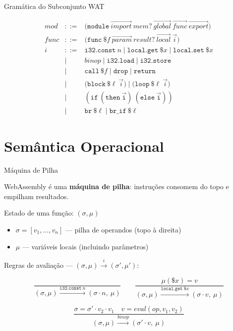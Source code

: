 \begin{frame}{Gramática do Subconjunto WAT}

    \[\begin{array}{lcl}
    \mathit{mod} & ::= & \mathtt{(module}\ \vec{\mathit{import}}\ \mathit{mem}?\ \vec{\mathit{global}}\ \vec{\mathit{func}}\ \vec{\mathit{export}}\mathtt{)} \\
    \mathit{func} & ::= & \mathtt{(func}\ \$f\ \vec{\mathit{param}}\ \mathit{result}?\ \vec{\mathit{local}}\ \vec{i}\mathtt{)} \\
    i & ::= & \mathtt{i32.const}\ n \mid \mathtt{local.get}\ \$x \mid \mathtt{local.set}\ \$x \\
    & \mid & \mathit{binop} \mid \mathtt{i32.load} \mid \mathtt{i32.store} \\
    & \mid & \mathtt{call}\ \$f \mid \mathtt{drop} \mid \mathtt{return} \\
    & \mid & \mathtt{(block}\ \$\ell\ \vec{i}\mathtt{)} \mid \mathtt{(loop}\ \$\ell\ \vec{i}\mathtt{)} \\
    & \mid & \mathtt{(if\ (then\ \vec{i})\ (else\ \vec{i}))} \\
    & \mid & \mathtt{br}\ \$\ell \mid \mathtt{br\_if}\ \$\ell
\end{array}\]
\end{frame}


\section{Semântica Operacional}\label{semuxe2ntica-operacional}

\begin{frame}{Máquina de Pilha}

    WebAssembly é uma \textbf{máquina de pilha}: instruções consomem do topo
    e empilham resultados.

    Estado de uma função: \((\sigma, \mu)\)

    \begin{itemize}

        \item
        \(\sigma = [v_1, \ldots, v_n]\) --- pilha de operandos (topo à
        direita)
        \item
        \(\mu\) --- variáveis locais (incluindo parâmetros)
    \end{itemize}

    Regras de avaliação ---
    \((\sigma, \mu) \xrightarrow{i} (\sigma', \mu')\):

    \[\frac{}{{(\sigma, \mu) \xrightarrow{\mathtt{i32.const}\ n} (\sigma \cdot n,\ \mu)}} \qquad \frac{\mu(\$x) = v}{(\sigma, \mu) \xrightarrow{\mathtt{local.get}\ \$x} (\sigma \cdot v,\ \mu)}\]

    \[\frac{\sigma = \sigma' \cdot v_2 \cdot v_1 \quad v = \mathit{eval}(\mathit{op}, v_1, v_2)}{(\sigma, \mu) \xrightarrow{\mathit{binop}} (\sigma' \cdot v,\ \mu)}\]
\end{frame}

